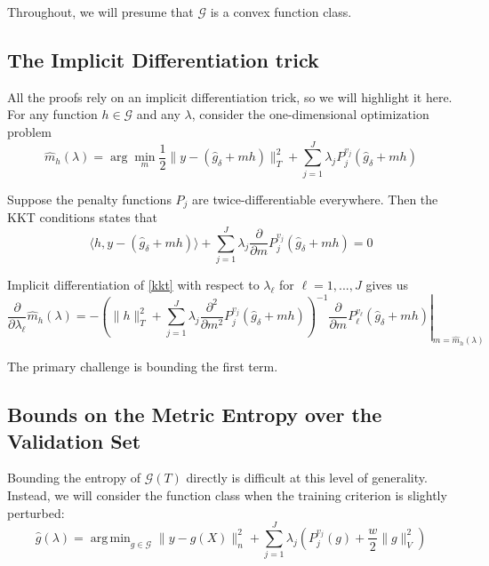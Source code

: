 \documentclass[12pt]{article}
\DeclareMathOperator*{\argmin}{arg\,min}
\begin{document}
Throughout, we will presume that $\mathcal{G}$ is a convex function class. 

\subsection{The Implicit Differentiation trick}
\label{sec:imp_diff}

All the proofs rely on an implicit differentiation trick, so we will highlight it here. For any function $h \in \mathcal{G}$ and any $\lambda$, consider the one-dimensional optimization problem
\begin{equation}
\label{one_dim_opt}
\hat{m}_{h}(\lambda)=\arg\min_{m}\frac{1}{2}\|y-(\hat{g}_{\delta}+mh)\|_{T}^{2} + \sum_{j=1}^J \lambda_j P_j^{v_j}(\hat{g}_\delta+mh)
\end{equation}

Suppose the penalty functions $P_j$ are twice-differentiable everywhere. Then the KKT conditions states that
\begin{equation}
\label{kkt}
\langle h, y - (\hat{g}_{\delta}+mh) \rangle + \sum_{j=1}^J \lambda_j \frac{\partial}{\partial m } P_j^{v_j}(\hat{g}_\delta+mh) = 0
\end{equation}

Implicit differentiation of \eqref{kkt} with respect to $\lambda_\ell$ for $\ell = 1, ..., J$ gives us
\[
\frac{\partial}{\partial\lambda_{\ell}}\hat{m}_{h}(\lambda) =
- \left.
\left( \|h\|_{T}^{2} + \sum_{j=1}^J \lambda_j \frac{\partial^{2}}{\partial m^{2}}P_j^{v_j} (\hat{g}_{\delta}+mh ) \right)^{-1}
\frac{\partial}{\partial m}P_{\ell}^{v_{\ell}}(\hat{g}_\delta+mh)
\right |_{m=\hat{m}_{h}(\lambda)}
\]

The primary challenge is bounding the first term. %

\subsection{Bounds on the Metric Entropy over the Validation Set}

Bounding the entropy of $\mathcal{G}(T)$ directly is difficult at this level of generality. Instead, we will consider the function class when the training criterion is slightly perturbed:
\begin{equation}
\label{train_crit_ridge}
\hat{g}(\lambda) = \argmin_{g\in \mathcal{G}} \| y -  g(X) \|^2_n + \sum_{j=1}^J \lambda_j \left ( P^{v_j}_j(g) + \frac{w}{2} \| g \|^2_V \right )
\end{equation}
\end{document}
